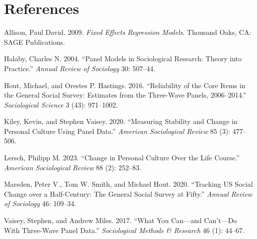 \documentclass[
]{article}
\newlength{\cslhangindent}
\newlength{\cslentryspacingunit} %
\newenvironment{CSLReferences}[2] %
 {%
  \setlength{\parindent}{0pt}
  \ifodd #1
  \let\oldpar\par
  \def\par{\hangindent=\cslhangindent\oldpar}
  \fi
  \setlength{\parskip}{#2\cslentryspacingunit}
 }%
 {}
\begin{document}
\hypertarget{references}{%
\section*{References}\label{references}}

\hypertarget{refs}{}
\begin{CSLReferences}{1}{0}
\leavevmode{}%
Allison, Paul David. 2009. \emph{Fixed {Effects} {Regression} {Models}}. Thousand Oaks, CA: SAGE Publications.

\leavevmode{}%
Halaby, Charles N. 2004. {``Panel {Models} in {Sociological} {Research}: {Theory} into {Practice}.''} \emph{Annual Review of Sociology} 30: 507--44.

\leavevmode{}%
Hout, Michael, and Orestes P. Hastings. 2016. {``Reliability of the Core Items in the General Social Survey: Estimates from the Three-Wave Panels, 2006--2014.''} \emph{Sociological Science} 3 (43): 971--1002.

\leavevmode{}%
Kiley, Kevin, and Stephen Vaisey. 2020. {``Measuring {Stability} and {Change} in {Personal} {Culture} {Using} {Panel} {Data}.''} \emph{American Sociological Review} 85 (3): 477--506.

\leavevmode{}%
Lersch, Philipp M. 2023. {``Change in {Personal} {Culture} {Over} the {Life} {Course}.''} \emph{American Sociological Review} 88 (2): 252--83.

\leavevmode{}%
Marsden, Peter V., Tom W. Smith, and Michael Hout. 2020. {``Tracking US Social Change over a Half-Century: The General Social Survey at Fifty.''} \emph{Annual Review of Sociology} 46: 109--34.

\leavevmode{}%
Vaisey, Stephen, and Andrew Miles. 2017. {``What {You} {Can}---and {Can}'t---{Do} {With} {Three}-{Wave} {Panel} {Data}.''} \emph{Sociological Methods \& Research} 46 (1): 44--67.

\end{CSLReferences}
\end{document}
